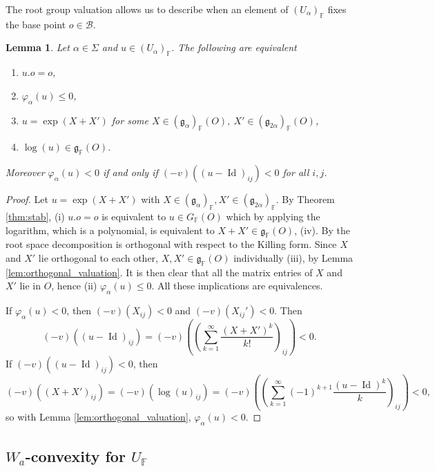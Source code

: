 \documentclass[12pt]{amsart}
\newcommand{\F}{\mathbb{F} }
\newcommand{\frakg}{\mathfrak{g}}
\newcommand{\B}{\mathcal{B}}
\newcommand{\Id}{\operatorname{Id} }
\numberwithin{equation}{section}
\newtheorem{lemma}[theorem]{Lemma}
\theoremstyle{remark} %
\begin{document}
The root group valuation allows us to describe when an element of $(U_\alpha)_\F$ fixes the base point $o \in \B$.

\begin{lemma}\label{lem:stab_Ualpha}
	Let $\alpha \in \Sigma$ and $u \in (U_\alpha)_\F$. The following are equivalent
	\begin{enumerate}
		\item [(i)] $u.o = o$,
		\item [(ii)] $\varphi_\alpha(u) \leq 0$,
		\item [(iii)] $u = \exp(X + X')$ for some $X\in (\frakg_\alpha)_\F(O), \ X'\in (\frakg_{2\alpha})_\F(O)$,
		\item [(iv)] $\log(u) \in \frakg_\F(O)$.%
	\end{enumerate}
Moreover $\varphi_\alpha(u) < 0$ if and only if $(-v)\left((u - \Id)_{ij}\right) < 0$ for all $i,j$.
\end{lemma}
\begin{proof}
	Let $u = \exp(X+X')$ with $X\in (\frakg_\alpha)_\F, X'\in (\frakg_{2\alpha})_\F$. By Theorem \ref{thm:stab}, (i) $u.o = o$ is equivalent to $u \in G_\F(O)$ which by applying the logarithm, which is a polynomial, is equivalent to $X+X' \in \frakg_\F (O)$, (iv). By \cite[Proposition \ref{I-prop:root_decomp}]{AppAGRCF} the root space decomposition is orthogonal with respect to the Killing form. Since $X$ and $X'$ lie orthogonal to each other, $X,X' \in \frakg_\F(O)$ individually (iii), by Lemma \ref{lem:orthogonal_valuation}. It is then clear that all the matrix entries of $X$ and $X'$ lie in $O$, hence (ii) $\varphi_\alpha(u) \leq 0$. All these implications are equivalences.
	
    If $\varphi_\alpha(u) < 0$, then $(-v)(X_{ij})< 0$ and $(-v)(X_{ij}') < 0$. Then
    $$
    (-v)\left((u-\Id)_{ij} \right)= (-v)\left(\left( \sum_{k=1}^\infty \frac{(X+X')^k}{k!} \right)_{ij} \right)< 0.
    $$  
    If $(-v)((u-\Id)_{ij})<0$, then 
    $$
    (-v)((X+X')_{ij}) =(-v)( \log(u)_{ij} ) = (-v)\left( \left(\sum_{k=1}^{\infty} (-1)^{k+1}\frac{(u-\Id)^k}{k} \right)_{ij} \right) < 0,
    $$
    so with Lemma \ref{lem:orthogonal_valuation}, $\varphi_\alpha(u) < 0$.
\end{proof}

\subsection{\texorpdfstring{$W_a$}{W}-convexity for \texorpdfstring{$U_\F$}{U(F)}}\label{sec:Wconvexity_for_U}
\end{document}
